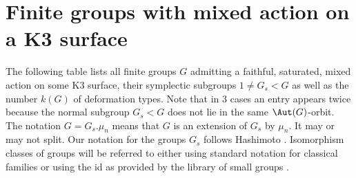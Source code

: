 \section{Finite groups with mixed action on a K3 surface}
\label{appendixA}
The following table lists all finite groups $G$ admitting a faithful, saturated, mixed action on some K3 surface, their symplectic subgroups $1\neq G_s < G$ as well as the number $k(G)$ of deformation types.
Note that in 3 cases an entry appears twice because
the normal subgroup $G_s < G$ does not lie in the same $\Aut(G)$-orbit.
The notation $G = G_s.\mu_n$ means that $G$ is an extension of $G_s$ by $\mu_n$. It may or may not split. Our notation for the groups $G_s$ follows Hashimoto \cite{Hashimoto2012}. Isomorphism classes of groups will be referred to
either using standard notation for classical families or
using the id as provided by the library of small groups \cite{Besche2002}.

